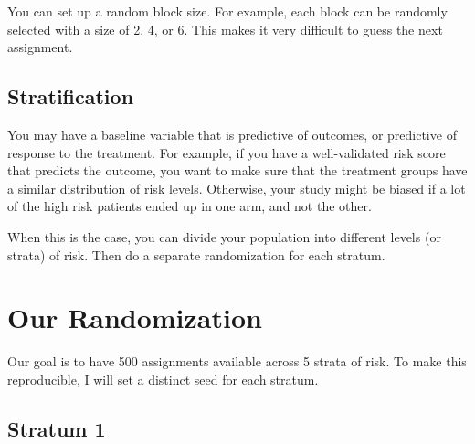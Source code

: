 \documentclass[
]{book}
\newenvironment{Shaded}{\begin{snugshade}}{\end{snugshade}}
\newcommand{\CommentTok}[1]{\textcolor[rgb]{0.56,0.35,0.01}{\textit{#1}}}
\newcommand{\DataTypeTok}[1]{\textcolor[rgb]{0.13,0.29,0.53}{#1}}
\newcommand{\DecValTok}[1]{\textcolor[rgb]{0.00,0.00,0.81}{#1}}
\newcommand{\KeywordTok}[1]{\textcolor[rgb]{0.13,0.29,0.53}{\textbf{#1}}}
\newcommand{\NormalTok}[1]{#1}
\newcommand{\OperatorTok}[1]{\textcolor[rgb]{0.81,0.36,0.00}{\textbf{#1}}}
\newcommand{\StringTok}[1]{\textcolor[rgb]{0.31,0.60,0.02}{#1}}
\begin{document}
You can set up a random block size. For example, each block can be randomly selected with a size of 2, 4, or 6. This makes it very difficult to guess the next assignment.

\hypertarget{stratification}{%
\subsection{Stratification}\label{stratification}}

You may have a baseline variable that is predictive of outcomes, or predictive of response to the treatment. For example, if you have a well-validated risk score that predicts the outcome, you want to make sure that the treatment groups have a similar distribution of risk levels. Otherwise, your study might be biased if a lot of the high risk patients ended up in one arm, and not the other.

When this is the case, you can divide your population into different levels (or strata) of risk. Then do a separate randomization for each stratum.

\hypertarget{our-randomization}{%
\section{Our Randomization}\label{our-randomization}}

Our goal is to have 500 assignments available across 5 strata of risk.
To make this reproducible, I will set a distinct seed for each stratum.

\hypertarget{stratum-1}{%
\subsection{Stratum 1}\label{stratum-1}}

\begin{Shaded}
\end{Shaded}
\end{document}
